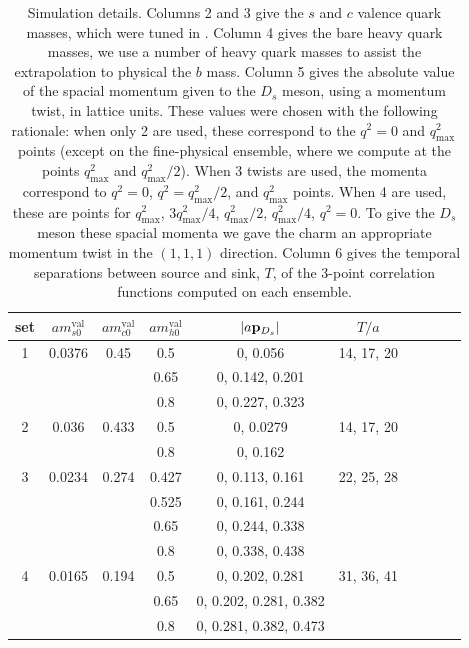 \begin{table}[htb!]
  \begin{center}
    \begin{tabular}{c c c c c c c c c c}
      \hline
      set & $am_{s0}^{\text{val}}$ & $am_{c0}^{\text{val}}$ & $am^{\text{val}}_{h0}$ & $|a{\bf{p}}_{D_s}|$ & $T/a$ \\ [0.5ex]
      \hline
      1 & 0.0376 & 0.45
      & 0.5 & 0, 0.056 & 14, 17, 20 \\ [1ex]
      & & & 0.65 & 0, 0.142, 0.201 &  \\ [1ex]
      & & & 0.8 & 0, 0.227, 0.323 &  \\ [1ex]

      \hline
      2 & 0.036 & 0.433
      & 0.5 & 0, 0.0279 & 14, 17, 20 \\ [1ex]
      & & & 0.8 & 0, 0.162  & \\ [1ex]

      \hline
      3 & 0.0234 & 
      0.274 & 0.427 & 0, 0.113, 0.161 & 22, 25, 28 \\ [1ex]
      & & & 0.525 & 0, 0.161, 0.244 & \\ [1ex]
      & & & 0.65 & 0, 0.244, 0.338 & \\ [1ex]
      & & & 0.8 & 0, 0.338, 0.438 & \\ [1ex]

      \hline
      4 & 0.0165 
      & 0.194 & 0.5 & 0, 0.202, 0.281 & 31, 36, 41 \\ [1ex]
      & & & 0.65 & 0, 0.202, 0.281, 0.382 & \\ [1ex]
      & & & 0.8 & 0, 0.281, 0.382, 0.473 & \\ [1ex]
      \hline
    \end{tabular}
  \end{center}
  \caption{Simulation details. Columns 2 and 3 give the $s$ and $c$ valence quark masses, which were tuned in \cite{Chakraborty:2014aca}. Column 4 gives the bare heavy quark masses, we use a number of heavy quark masses to assist the extrapolation to physical the $b$ mass. Column 5 gives the absolute value of the spacial momentum given to the $D_s$ meson, using a momentum twist, in lattice units. These values were chosen with the following rationale: when only 2 are used, these correspond to the $q^2=0$ and $q^2_{\text{max}}\,$ points (except on the fine-physical ensemble, where we compute at the points $q^2_{\text{max}}$ and $q^2_{\text{max}}/2$). When 3 twists are used, the momenta correspond to $q^2=0$, $q^2=q^2_{\text{max}}/2$, and $q^2_{\text{max}}$ points. When 4 are used, these are points for $q^2_{\text{max}}$, $3q^2_{\text{max}}/4$, $q^2_{\text{max}}/2$, $q^2_{\text{max}}/4$, $q^2=0$. To give the $D_s$ meson these spacial momenta we gave the charm an appropriate momentum twist in the $(1,1,1)$ direction. Column 6 gives the temporal separations between source and sink, $T$, of the 3-point correlation functions computed on each ensemble.}
  \label{tab:simulation}
\end{table}

